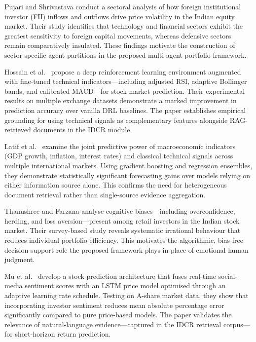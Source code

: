 \documentclass[12pt,a4paper,oneside]{report}
\theoremstyle{definition}
\theoremstyle{remark}
\begin{document}
\medskip

\noindent Pujari and Shrivastava \cite{Pujari2025FII} conduct a sectoral analysis of how foreign institutional investor (FII) inflows and outflows drive price volatility in the Indian equity market. Their study identifies that technology and financial sectors exhibit the greatest sensitivity to foreign capital movements, whereas defensive sectors remain comparatively insulated. These findings motivate the construction of sector-specific agent partitions in the proposed multi-agent portfolio framework.

\medskip

\noindent Hossain et al.\ \cite{Hossain2024DRL} propose a deep reinforcement learning environment augmented with fine-tuned technical indicators---including adjusted RSI, adaptive Bollinger bands, and calibrated MACD---for stock market prediction. Their experimental results on multiple exchange datasets demonstrate a marked improvement in prediction accuracy over vanilla DRL baselines. The paper establishes empirical grounding for using technical signals as complementary features alongside RAG-retrieved documents in the IDCR module.

\medskip

\noindent Latif et al.\ \cite{Latif2025MacroTech} examine the joint predictive power of macroeconomic indicators (GDP growth, inflation, interest rates) and classical technical signals across multiple international markets. Using gradient boosting and regression ensembles, they demonstrate statistically significant forecasting gains over models relying on either information source alone. This confirms the need for heterogeneous document retrieval rather than single-source evidence aggregation.

\medskip

\noindent Thanushree and Farzana \cite{Thanushree2024Behaviour} analyse cognitive biases---including overconfidence, herding, and loss aversion---present among retail investors in the Indian stock market. Their survey-based study reveals systematic irrational behaviour that reduces individual portfolio efficiency. This motivates the algorithmic, bias-free decision support role the proposed framework plays in place of emotional human judgment.

\medskip

\noindent Mu et al.\ \cite{Mu2023SentimentLSTM} develop a stock prediction architecture that fuses real-time social-media sentiment scores with an LSTM price model optimised through an adaptive learning rate schedule. Testing on A-share market data, they show that incorporating investor sentiment reduces mean absolute percentage error significantly compared to pure price-based models. The paper validates the relevance of natural-language evidence---captured in the IDCR retrieval corpus---for short-horizon return prediction.
\end{document}

